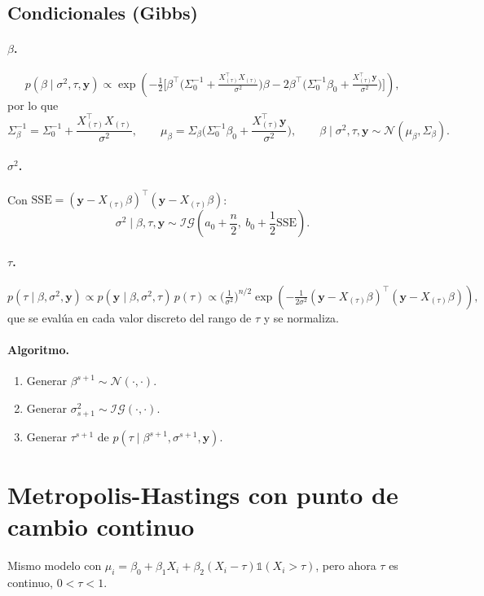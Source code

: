 \documentclass[11pt]{article}
\newcommand{\N}{\mathcal{N}}
\newcommand{\IG}{\mathcal{IG}}
\newcommand{\ind}{\mathbb{1}}
\newcommand{\by}{\mathbf{y}}
\theoremstyle{definition}
\begin{document}
\subsection{Condicionales (Gibbs)}
\paragraph{$\beta$.}
\[
p(\beta\mid\sigma^2,\tau,\by)\propto\exp\!\left(-\tfrac{1}{2}\Big[\beta^{\top}\Big(\Sigma_0^{-1}+\tfrac{X_{(\tau)}^{\top}X_{(\tau)}}{\sigma^2}\Big)\beta-2\beta^{\top}\Big(\Sigma_0^{-1}\beta_0+\tfrac{X_{(\tau)}^{\top}\by}{\sigma^2}\Big)\Big]\right),
\]
por lo que
\[
\Sigma_\beta^{-1}=\Sigma_0^{-1}+\frac{X_{(\tau)}^{\top}X_{(\tau)}}{\sigma^2},\qquad
\mu_\beta=\Sigma_\beta\Big(\Sigma_0^{-1}\beta_0+\frac{X_{(\tau)}^{\top}\by}{\sigma^2}\Big),
\qquad
\beta\mid\sigma^2,\tau,\by\sim\N(\mu_\beta,\Sigma_\beta).
\]

\paragraph{$\sigma^2$.} Con $\text{SSE}=(\by-X_{(\tau)}\beta)^{\top}(\by-X_{(\tau)}\beta)$:
\[
\sigma^2\mid\beta,\tau,\by\sim\IG\!\left(a_0+\frac{n}{2},\ b_0+\frac{1}{2}\text{SSE}\right).
\]

\paragraph{$\tau$.}
\[
p(\tau\mid\beta,\sigma^2,\by)\propto p(\by\mid\beta,\sigma^2,\tau)\,p(\tau)\propto\Big(\tfrac{1}{\sigma^2}\Big)^{n/2}\exp\!\left(-\tfrac{1}{2\sigma^2}(\by-X_{(\tau)}\beta)^{\top}(\by-X_{(\tau)}\beta)\right),
\]
que se evalúa en cada valor discreto del rango de $\tau$ y se normaliza.

\paragraph{Algoritmo.}
\begin{enumerate}[leftmargin=2em]
  \item Generar $\beta^{s+1}\sim\N(\cdot,\cdot)$.
  \item Generar $\sigma^2_{s+1}\sim\IG(\cdot,\cdot)$.
  \item Generar $\tau^{s+1}$ de $p(\tau\mid\beta^{s+1},\sigma^{s+1},\by)$.
\end{enumerate}

\section{Metropolis-Hastings con punto de cambio continuo}
Mismo modelo con $\mu_i=\beta_0+\beta_1 X_i+\beta_2(X_i-\tau)\ind(X_i>\tau)$, pero ahora $\tau$ es continuo, $0<\tau<1$.
\end{document}
